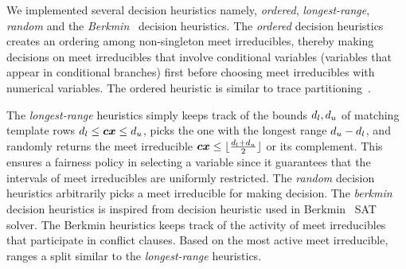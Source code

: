 
We implemented several decision heuristics namely, {\em ordered}, 
{\em longest-range}, {\em random} and the 
{\em Berkmin}~\cite{eugoldberg07} decision heuristics.  
The {\em ordered} decision heuristics creates an ordering among non-singleton 
meet irreducibles, thereby making decisions on meet irreducibles that involve 
conditional variables (variables that appear in conditional branches) first 
before choosing meet irreducibles with numerical variables.  
The ordered heuristic is similar to trace partitioning~\cite{toplas07}.

The {\em longest-range} heuristics simply keeps track of the bounds
$d_l,d_u$ of matching template rows $d_l\leq
{\boldsymbol c}{\boldsymbol x}\leq d_u$, picks the one with the longest range
$d_u-d_l$, and randomly returns the meet irreducible
${\boldsymbol c}{\boldsymbol x}\leq
\lfloor\frac{d_l+d_u}{2}\rfloor$ or its
complement. This ensures a fairness policy in selecting a variable
since it guarantees that the intervals of meet irreducibles are
uniformly restricted.
%
The {\em random} decision heuristics arbitrarily picks a meet irreducible  
for making decision. %
%
%
The {\em berkmin} decision heuristics is inspired 
from decision heuristic used in Berkmin~\cite{eugoldberg07} SAT solver.  
The Berkmin heuristics %
keeps track of the activity of %
meet irreducibles that participate in conflict clauses. 
Based on the most active meet irreducible, ranges a split similar to the {\em longest-range} heuristics.
%
